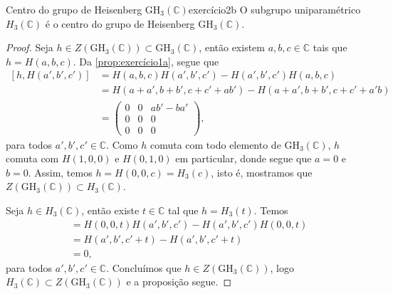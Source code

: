 \begin{proposition}{Centro do grupo de Heisenberg \(\mathrm{GH}_3(\mathbb{C})\)}{exercício2b}
    O subgrupo uniparamétrico \(H_3(\mathbb{C})\) é o centro do grupo de Heisenberg \(\mathrm{GH}_3(\mathbb{C})\).
\end{proposition}
\begin{proof}
    Seja \(h \in Z(\mathrm{GH}_3(\mathbb{C})) \subset \mathrm{GH}_3(\mathbb{C})\), então existem \(a,b,c \in \mathbb{C}\) tais que \(h = H(a,b,c)\). Da \cref{prop:exercício1a}, segue que
    \begin{align*}
        \left[h,H(a', b', c')\right] &= H(a,b,c)H(a',b',c') - H(a',b',c') H(a,b,c)\\
        &= H(a+a', b+b', c+c' + ab') - H(a+a', b+b', c+c' + a'b)\\
        &= \begin{pmatrix}
            0 & 0 & ab' - ba'\\
            0 & 0 & 0\\
            0 & 0 & 0
        \end{pmatrix},
    \end{align*}
    para todos \(a',b',c' \in \mathbb{C}\). Como \(h\) comuta com todo elemento de \(\mathrm{GH}_3(\mathbb{C})\), \(h\) comuta com \(H(1,0,0)\) e \(H(0,1,0)\) em particular, donde segue que \(a = 0\) e \(b = 0\). Assim, temos \(h = H(0,0,c) = H_3(c)\), isto é, mostramos que \(Z(\mathrm{GH}_3(\mathbb{C})) \subset H_3(\mathbb{C})\).

    Seja \(h \in H_3(\mathbb{C})\), então existe \(t \in \mathbb{C}\) tal que \(h = H_3(t)\). Temos
    \begin{align*}
        [h, H(a',b',c')] &= H(0,0,t)H(a',b',c') - H(a',b',c')H(0,0,t)\\
                         &= H(a',b',c' + t) - H(a',b',c' + t)\\
                         &= 0,
    \end{align*}
    para todos \(a',b',c' \in \mathbb{C}\). Concluímos que \(h \in Z(\mathrm{GH}_3(\mathbb{C}))\), logo \(H_3(\mathbb{C}) \subset Z(\mathrm{GH}_3(\mathbb{C}))\) e a proposição segue.
\end{proof}
